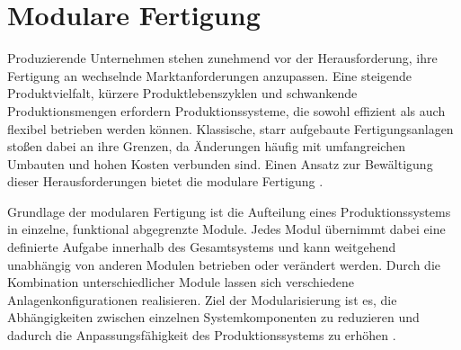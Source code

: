 %
%
\section{Modulare Fertigung}
\label{sec:ModulareFertigung}

Produzierende Unternehmen stehen zunehmend vor der Herausforderung, ihre Fertigung an wechselnde Marktanforderungen anzupassen. Eine steigende Produktvielfalt, kürzere Produktlebenszyklen und schwankende Produktionsmengen erfordern Produktionssysteme, die sowohl effizient als auch flexibel betrieben werden können. Klassische, starr aufgebaute Fertigungsanlagen stoßen dabei an ihre Grenzen, da Änderungen häufig mit umfangreichen Umbauten und hohen Kosten verbunden sind. Einen Ansatz zur Bewältigung dieser Herausforderungen bietet die modulare Fertigung \cite{Borgmann2026,Trautner2026}.

Grundlage der modularen Fertigung ist die Aufteilung eines Produktionssystems in einzelne, funktional abgegrenzte Module. Jedes Modul übernimmt dabei eine definierte Aufgabe innerhalb des Gesamtsystems und kann weitgehend unabhängig von anderen Modulen betrieben oder verändert werden. Durch die Kombination unterschiedlicher Module lassen sich verschiedene Anlagenkonfigurationen realisieren. Ziel der Modularisierung ist es, die Abhängigkeiten zwischen einzelnen Systemkomponenten zu reduzieren und dadurch die Anpassungsfähigkeit des Produktionssystems zu erhöhen \cite{Borgmann2026}.

